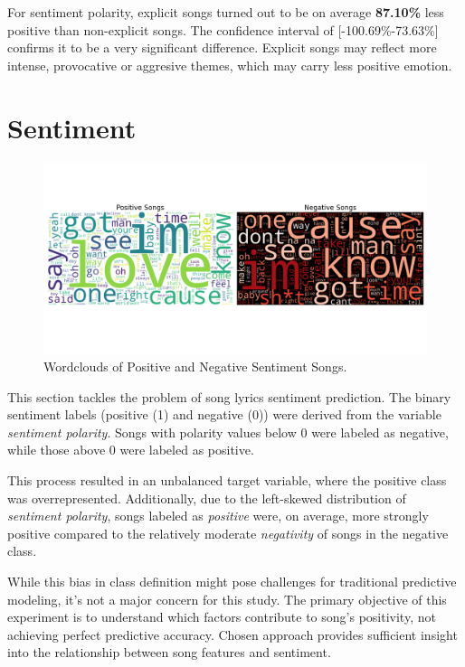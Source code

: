 For sentiment polarity, explicit songs turned out to be on average
\textbf{87.10\%} less positive than non-explicit songs. The confidence interval
of [-100.69\%-73.63\%] confirms it to be a very significant difference.
Explicit songs may reflect more intense, provocative or aggresive themes, which
may carry less positive emotion.


\section{Sentiment}
\label{sec:sentiment}
\begin{center}
\begin{figure}[H]
  \centering
  \includegraphics[width=7in]{img/wordclouds.png}
  \caption{Wordclouds of Positive and Negative Sentiment Songs.}
  \label{Figure:fig_bh}
\end{figure}
\end{center}

This section tackles the problem of song lyrics sentiment prediction. The
binary sentiment labels (positive (1) and negative (0)) were derived from the
variable \textit{sentiment polarity}. Songs with polarity values below 0 were
labeled as negative, while those above 0 were labeled as positive.


This process resulted in an unbalanced target variable, where the positive
class was overrepresented. Additionally, due to the left-skewed distribution of
\textit{sentiment polarity}, songs labeled as \textit{positive} were, on
average, more strongly positive compared to the relatively moderate
\textit{negativity} of songs in the negative class. 

While this bias in class definition might pose challenges for traditional
predictive modeling, it's not a major concern for this study. The primary
objective of this experiment is to understand which factors contribute to
song’s positivity, not achieving perfect predictive accuracy. Chosen approach
provides sufficient insight into the relationship between song features and
sentiment.


